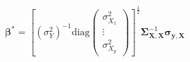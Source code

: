 \begin{equation}
	\boldsymbol{\beta}^{\ast}
	=
	\left[
		\left(
		\sigma_{Y}^{2}
		\right)^{-1}
		\mathrm{diag}
		\left(
		\begin{array}{c}
			\sigma_{X_{1}}^{2} \\
			\vdots             \\
			\sigma_{X_{p}}^{2} 
		\end{array}
		\right)
	\right]^{
		\frac{1}{2}
	}
	\boldsymbol{\Sigma}_{\mathbf{X}, \mathbf{X}}^{-1}
	\boldsymbol{\sigma}_{\mathbf{y}, \mathbf{X}}
	\label{eq:strRegression-betastar-of-sigmacap}
\end{equation}
